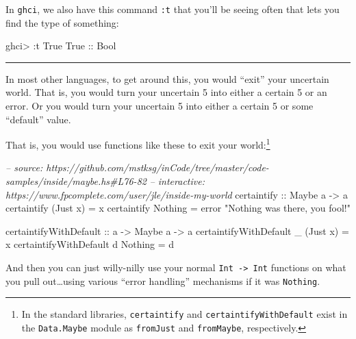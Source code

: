 \documentclass[]{article}
\newenvironment{Shaded}{}{}
\newcommand{\DataTypeTok}[1]{\textcolor[rgb]{0.56,0.13,0.00}{{#1}}}
\newcommand{\StringTok}[1]{\textcolor[rgb]{0.25,0.44,0.63}{{#1}}}
\newcommand{\CommentTok}[1]{\textcolor[rgb]{0.38,0.63,0.69}{\textit{{#1}}}}
\newcommand{\OtherTok}[1]{\textcolor[rgb]{0.00,0.44,0.13}{{#1}}}
\newcommand{\FunctionTok}[1]{\textcolor[rgb]{0.02,0.16,0.49}{{#1}}}
\newcommand{\NormalTok}[1]{{#1}}
\begin{document}
In \texttt{ghci}, we also have this command \texttt{:t} that you'll be
seeing often that lets you find the type of something:

\begin{Shaded}
\begin{Highlighting}[]
\NormalTok{ghci}\FunctionTok{>} \FunctionTok{:}\NormalTok{t }\DataTypeTok{True}
\DataTypeTok{True}\OtherTok{ ::} \DataTypeTok{Bool}
\end{Highlighting}
\end{Shaded}

\begin{center}\rule{0.5\linewidth}{\linethickness}\end{center}

In most other languages, to get around this, you would ``exit'' your
uncertain world. That is, you would turn your uncertain 5 into either a
certain 5 or an error. Or you would turn your uncertain 5 into either a
certain 5 or some ``default'' value.

That is, you would use functions like these to exit your
world:\footnote{In the standard libraries, \texttt{certaintify} and
  \texttt{certaintifyWithDefault} exist in the \texttt{Data.Maybe}
  module as \texttt{fromJust} and \texttt{fromMaybe}, respectively.}

\begin{Shaded}
\begin{Highlighting}[]
\CommentTok{-- source: https://github.com/mstksg/inCode/tree/master/code-samples/inside/maybe.hs#L76-82}
\CommentTok{-- interactive: https://www.fpcomplete.com/user/jle/inside-my-world}
\OtherTok{certaintify ::} \DataTypeTok{Maybe} \NormalTok{a }\OtherTok{->} \NormalTok{a}
\NormalTok{certaintify (}\DataTypeTok{Just} \NormalTok{x) }\FunctionTok{=} \NormalTok{x}
\NormalTok{certaintify }\DataTypeTok{Nothing}  \FunctionTok{=} \NormalTok{error }\StringTok{"Nothing was there, you fool!"}

\OtherTok{certaintifyWithDefault ::} \NormalTok{a }\OtherTok{->} \DataTypeTok{Maybe} \NormalTok{a }\OtherTok{->} \NormalTok{a}
\NormalTok{certaintifyWithDefault _ (}\DataTypeTok{Just} \NormalTok{x) }\FunctionTok{=} \NormalTok{x}
\NormalTok{certaintifyWithDefault d }\DataTypeTok{Nothing}  \FunctionTok{=} \NormalTok{d}
\end{Highlighting}
\end{Shaded}

And then you can just willy-nilly use your normal
\texttt{Int\ -\textgreater{}\ Int} functions on what you pull
out\ldots{}using various ``error handling'' mechanisms if it was
\texttt{Nothing}.
\end{document}
